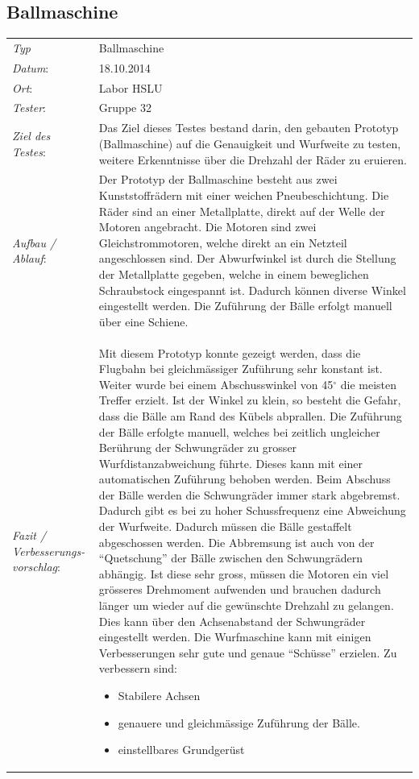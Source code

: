 \subsection{Ballmaschine}
\begin{tabular}{p{3.6cm}p{\textwidth-3.6cm-0.7cm}}
\rule{0pt}{11pt}\textit{Typ}              & Ballmaschine \\ 
\rule{0pt}{11pt}\textit{Datum}:           & 18.10.2014   \\
\rule{0pt}{11pt}\textit{Ort}:             & Labor HSLU \\
\rule{0pt}{11pt}\textit{Tester}:          & Gruppe 32 \\
\rule{0pt}{11pt}\textit{Ziel des Testes}: & Das Ziel dieses Testes 
bestand darin, den gebauten Prototyp (Ballmaschine) auf die Genauigkeit 
und Wurfweite zu testen, weitere Erkenntnisse über die Drehzahl der Räder 
zu eruieren. \\
\rule{0pt}{11pt}\textit{Aufbau / Ablauf}: & 
Der Prototyp der Ballmaschine besteht aus zwei Kunststoffrädern mit einer weichen 
Pneubeschichtung. Die Räder sind an einer Metallplatte, direkt auf der 
Welle der Motoren angebracht. Die Motoren sind zwei Gleichstrommotoren, 
welche direkt an ein Netzteil angeschlossen sind. Der Abwurfwinkel ist durch die Stellung 
der Metallplatte gegeben, welche in einem beweglichen Schraubstock 
eingespannt ist. Dadurch können diverse Winkel eingestellt werden. 
Die Zuführung der Bälle erfolgt manuell über eine Schiene.\\
\rule{0pt}{11pt}\textit{Fazit / Verbesserungs-\newline vorschlag}: & 
Mit diesem Prototyp konnte gezeigt werden, dass die Flugbahn bei gleichmässiger 
Zuführung sehr konstant ist. Weiter wurde bei einem Abschusswinkel von 45$^\circ$ 
die meisten Treffer erzielt. Ist der Winkel zu klein, so besteht die Gefahr, 
dass die Bälle am Rand des Kübels abprallen. Die Zuführung der Bälle erfolgte 
manuell, welches bei zeitlich ungleicher Berührung der Schwungräder zu grosser 
Wurfdistanzabweichung führte. Dieses kann mit einer automatischen Zuführung behoben 
werden. Beim Abschuss der Bälle werden die Schwungräder immer stark abgebremst. 
Dadurch gibt es bei zu hoher Schussfrequenz eine Abweichung der Wurfweite. Dadurch 
müssen die Bälle gestaffelt abgeschossen werden. Die Abbremsung ist auch von der 
\enquote{Quetschung} der Bälle zwischen den Schwungrädern abhängig. Ist diese sehr 
gross, müssen die Motoren ein viel grösseres Drehmoment aufwenden und brauchen 
dadurch länger um wieder auf die gewünschte Drehzahl zu gelangen. Dies kann über 
den Achsenabstand der Schwungräder eingestellt werden.\newline
%
Die Wurfmaschine kann mit einigen Verbesserungen sehr gute und genaue 
\enquote{Schüsse} erzielen. Zu verbessern sind:
\begin{itemize}
    \item Stabilere Achsen
    \item genauere und gleichmässige Zuführung der Bälle.
    \item einstellbares Grundgerüst
\end{itemize}\\
\end{tabular}

